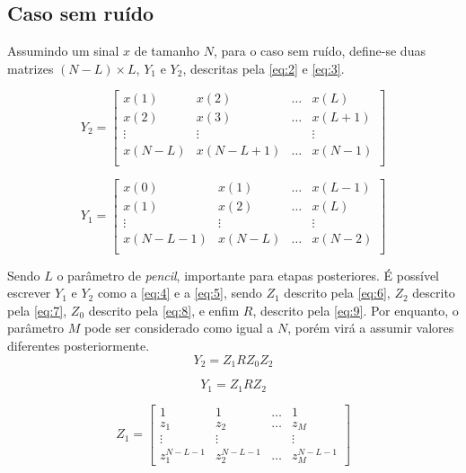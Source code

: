 \documentclass[12pt]{article}
\begin{document}
\subsection{Caso sem ruído}
Assumindo um sinal $x$ de tamanho $N$, para o caso sem ruído, define-se duas matrizes $(N-L) \times L$, $Y_1$ e $Y_2$, descritas pela \autoref{eq:2} e \autoref{eq:3}.

\begin{equation} \label{eq:2}
    Y_2 = \begin{bmatrix} x(1) & x(2) & \dots & x(L) \\
                            x(2) & x(3) & \dots & x(L + 1) \\
                            \vdots & \vdots & & \vdots \\
                            x(N-L) & x(N - L + 1) & \dots & x(N-1) \\
    \end{bmatrix}
\end{equation}

\begin{equation} \label{eq:3}
    Y_1 = \begin{bmatrix} x(0) & x(1) & \dots & x(L-1) \\
                            x(1) & x(2) & \dots & x(L) \\
                            \vdots & \vdots & & \vdots \\
                            x(N - L - 1) & x(N - L) & \dots & x(N-2) \\
    \end{bmatrix}
\end{equation}

Sendo $L$ o parâmetro de \textit{pencil}, importante para etapas posteriores. É possível escrever $Y_1$ e $Y_2$ como a \autoref{eq:4} e a \autoref{eq:5}, sendo $Z_1$ descrito pela \autoref{eq:6}, $Z_2$ descrito pela \autoref{eq:7}, $Z_0$ 
descrito pela \autoref{eq:8}, e enfim $R$, descrito pela \autoref{eq:9}. Por enquanto, o parâmetro $M$ pode ser considerado como igual a $N$, porém virá a assumir valores diferentes posteriormente.
\begin{equation} \label{eq:4}
    Y_2 = Z_1 R Z_0 Z_2
\end{equation}

\begin{equation} \label{eq:5}
    Y_1 = Z_1 R Z_2
\end{equation}

\begin{equation} \label{eq:6}
    Z_1 = \begin{bmatrix} 1 & 1 & \dots & 1 \\
                            z_1 & z_2 & \dots & z_M \\
                            \vdots & \vdots & & \vdots \\
                            z_1^{N - L - 1} & z_2^{N - L - 1} & \dots & z_M^{N - L - 1} 
    \end{bmatrix}  
\end{equation}
\end{document}
